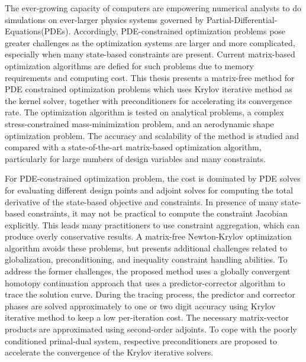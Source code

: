  
 
The ever-growing capacity of computers are empowering numerical analysts to do simulations on ever-larger physics systems governed by Partial-Differential-Equations(PDEs). Accordingly, PDE-constrained optimization problems pose greater challenges as the optimization systems are larger and more complicated, especially when many state-based constraints are present. Current matrix-based optimization algorithms are defied for such problems due to memory requirements and computing cost. This thesis presents a matrix-free method for PDE constrained optimization problems which uses Krylov iterative method as the kernel solver, together with preconditioners for accelerating its convergence rate. The optimization algorithm is tested on analytical problems, a complex stress-constrained mass-minimization problem, and an aerodynamic shape optimization problem. The accuracy and scalability of the method is studied and compared with a state-of-the-art matrix-based optimization algorithm, particularly for large numbers of design variables and many constraints. 

For PDE-constrained optimization problem, the cost is dominated by PDE solves for evaluating different design points and adjoint solves for computing the total derivative of the state-based objective and constraints. In presence of many state-based constraints, it may not be practical to compute the constraint Jacobian explicitly.  This leads many practitioners to use constraint aggregation, which can produce overly conservative results.  A matrix-free Newton-Krylov optimization algorithm avoids these problems, but presents additional challenges related to globalization, preconditioning, and inequality constraint handling abilities. To address the former challenges, the proposed method uses a globally convergent homotopy continuation approach that uses a predictor-corrector algorithm to trace the solution curve. During the tracing process, the predictor and corrector phases are solved approximately to one or two digit accuracy using Krylov iterative method to keep a low per-iteration cost. The necessary matrix-vector products are approximated using second-order adjoints. To cope with the poorly conditioned primal-dual system, respective preconditioners are proposed to accelerate the convergence of the Krylov iterative solvers.  

